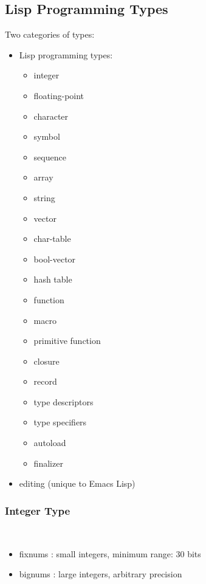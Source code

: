 \documentclass{article}
\begin{document}
\subsection{Lisp Programming Types}
Two categories of types:
\begin{itemize}
    \item Lisp programming types:
          \begin{itemize}
              \item integer
              \item floating-point
              \item character
              \item symbol
              \item sequence
              \item array
              \item string
              \item vector
              \item char-table
              \item bool-vector
              \item hash table
              \item function
              \item macro
              \item primitive function
              \item closure
              \item record
              \item type descriptors
              \item type specifiers
              \item autoload
              \item finalizer
          \end{itemize}
    \item editing (unique to Emacs Lisp)
\end{itemize}

\subsubsection{Integer Type}
\begin{definition}[integer]~
    \begin{itemize}
        \item fixnums : small integers, minimum range: 30 bits
        \item bignums : large integers, arbitrary precision
    \end{itemize}
\end{definition}
\end{document}
